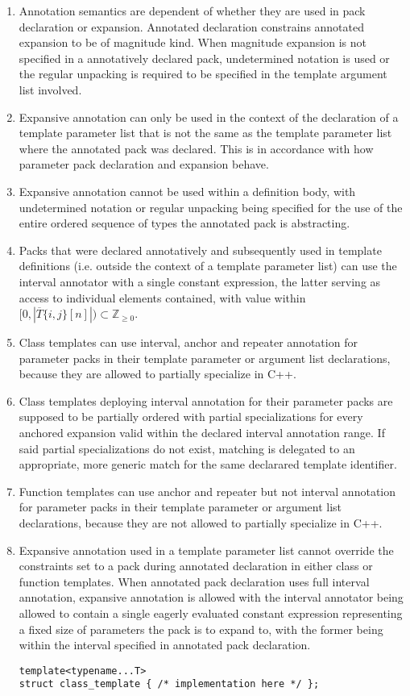 \documentclass[ notitlepage
              , a4paper
              , twoside ]{article}
\begin{document}
\begin{enumerate}
\item Annotation semantics are dependent of whether they are used in pack declaration or expansion.
Annotated declaration constrains annotated expansion to be of magnitude kind.
When magnitude expansion is not specified in a annotatively declared pack, undetermined notation is used or the regular unpacking is required to be specified in the template argument list involved.
\item Expansive annotation can only be used in the context of the declaration of a template parameter list that is not the same as the template parameter list where the annotated pack was declared. This is in accordance with how parameter pack declaration and expansion behave.
\item Expansive annotation cannot be used within a definition body, with undetermined notation or regular unpacking being specified for the use of the entire ordered sequence of types the annotated pack is abstracting.
\item Packs that were declared annotatively and subsequently used in template definitions (i.e. outside the context of a template parameter list) can use the interval annotator with a single constant expression, the latter serving as access to individual elements contained, with value within $[0,|\overline{T}\{i,j\}[n]|)\subset{\mathbb{Z}_{\geq 0}}$.
\item Class templates can use interval, anchor and repeater annotation for parameter packs in their template parameter or argument list declarations, because they are allowed to partially specialize in C++.
\item Class templates deploying interval annotation for their parameter packs are supposed to be partially ordered with partial specializations for every anchored expansion valid within the declared interval annotation range.
If said partial specializations do not exist, matching is delegated to an appropriate, more generic match for the same declarared template identifier.
\item Function templates can use anchor and repeater but not interval annotation for parameter packs in their template parameter or argument list declarations, because they are not allowed to partially specialize in C++.
\item Expansive annotation used in a template parameter list cannot override the constraints set to a pack during annotated declaration in either class or function templates.
When annotated pack declaration uses full interval annotation, expansive annotation is allowed with the interval annotator being allowed to contain a single eagerly evaluated constant expression representing a fixed size of parameters the pack is to expand to, with the former being within the interval specified in annotated pack declaration.
\begin{verbatim}
template<typename...T>
struct class_template { /* implementation here */ };


\end{verbatim}
\end{enumerate}
\end{document}
